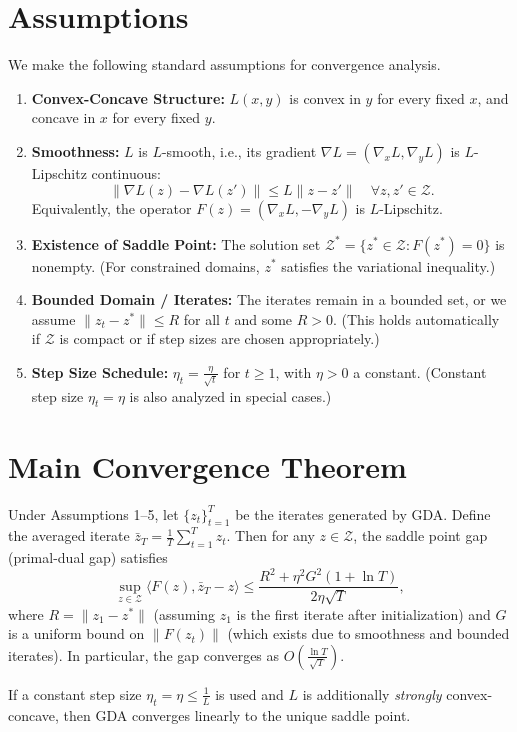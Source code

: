 \documentclass{article}
\begin{document}
\section*{Assumptions}
We make the following standard assumptions for convergence analysis.

\begin{enumerate}
    \item \textbf{Convex-Concave Structure:} $L(x,y)$ is convex in $y$ for every fixed $x$, and concave in $x$ for every fixed $y$.
    \item \textbf{Smoothness:} $L$ is $L$-smooth, i.e., its gradient $\nabla L = (\nabla_x L, \nabla_y L)$ is $L$-Lipschitz continuous:
    \[
    \|\nabla L(z) - \nabla L(z')\| \le L \|z - z'\| \quad \forall z, z' \in \mathcal{Z}.
    \]
    Equivalently, the operator $F(z) = (\nabla_x L, -\nabla_y L)$ is $L$-Lipschitz.
    \item \textbf{Existence of Saddle Point:} The solution set $\mathcal{Z}^* = \{z^* \in \mathcal{Z} : F(z^*) = 0\}$ is nonempty. (For constrained domains, $z^*$ satisfies the variational inequality.)
    \item \textbf{Bounded Domain / Iterates:} The iterates remain in a bounded set, or we assume $\|z_t - z^*\| \le R$ for all $t$ and some $R > 0$. (This holds automatically if $\mathcal{Z}$ is compact or if step sizes are chosen appropriately.)
    \item \textbf{Step Size Schedule:} $\eta_t = \frac{\eta}{\sqrt{t}}$ for $t \ge 1$, with $\eta > 0$ a constant. (Constant step size $\eta_t = \eta$ is also analyzed in special cases.)
\end{enumerate}

\section*{Main Convergence Theorem}
Under Assumptions 1--5, let $\{z_t\}_{t=1}^T$ be the iterates generated by GDA. Define the averaged iterate $\bar{z}_T = \frac{1}{T}\sum_{t=1}^T z_t$. Then for any $z \in \mathcal{Z}$, the saddle point gap (primal-dual gap) satisfies
\[
\sup_{z \in \mathcal{Z}} \langle F(z), \bar{z}_T - z \rangle \le \frac{R^2 + \eta^2 G^2 (1 + \ln T)}{2\eta \sqrt{T}},
\]
where $R = \|z_1 - z^*\|$ (assuming $z_1$ is the first iterate after initialization) and $G$ is a uniform bound on $\|F(z_t)\|$ (which exists due to smoothness and bounded iterates). In particular, the gap converges as $O\left(\frac{\ln T}{\sqrt{T}}\right)$.

If a constant step size $\eta_t = \eta \le \frac{1}{L}$ is used and $L$ is additionally \textit{strongly} convex-concave, then GDA converges linearly to the unique saddle point.
\end{document}
